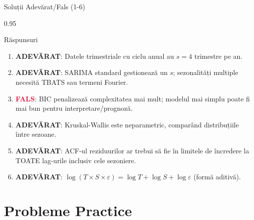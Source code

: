 \documentclass[9pt, aspectratio=169, t]{beamer}
\begin{document}
\begin{frame}{Soluții Adevărat/Fals (1-6)}
    \begin{cminipage}{0.95\textwidth}
    \begin{exampleblock}{Răspunsuri}
    \begin{enumerate}\setlength{\itemsep}{0pt}
        \item \textcolor{Forest}{\textbf{ADEVĂRAT}}: Datele trimestriale cu ciclu anual au $s=4$ trimestre pe an.
        \item \textcolor{Forest}{\textbf{ADEVĂRAT}}: SARIMA standard gestionează un $s$; sezonalități multiple necesită TBATS sau termeni Fourier.
        \item \textcolor{Crimson}{\textbf{FALS}}: BIC penalizează complexitatea mai mult; modelul mai simplu poate fi mai bun pentru interpretare/prognoză.
        \item \textcolor{Forest}{\textbf{ADEVĂRAT}}: Kruskal-Wallis este neparametric, comparând distribuțiile între sezoane.
        \item \textcolor{Forest}{\textbf{ADEVĂRAT}}: ACF-ul reziduurilor ar trebui să fie în limitele de încredere la TOATE lag-urile inclusiv cele sezoniere.
        \item \textcolor{Forest}{\textbf{ADEVĂRAT}}: $\log(T \times S \times \varepsilon) = \log T + \log S + \log \varepsilon$ (formă aditivă).
    \end{enumerate}
    \end{exampleblock}
    \end{cminipage}
\end{frame}

\section{Probleme Practice}
\end{document}
